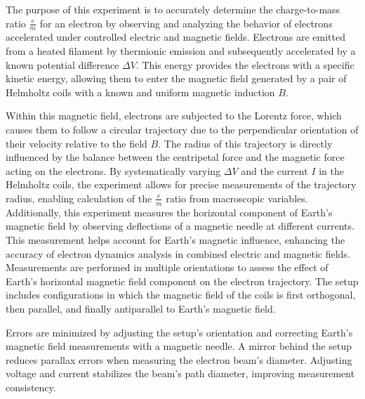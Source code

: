 
%


The purpose of this experiment is to accurately determine the charge-to-mass ratio \( \frac{e}{m} \) for an electron by observing and analyzing the behavior of electrons accelerated under controlled electric and magnetic fields. Electrons are emitted from a heated filament by thermionic emission and subsequently accelerated by a known potential difference \( \Delta V \). This energy provides the electrons with a specific kinetic energy, allowing them to enter the magnetic field generated by a pair of Helmholtz coils with a known and uniform magnetic induction \( B \). 

Within this magnetic field, electrons are subjected to the Lorentz force, which causes them to follow a circular trajectory due to the perpendicular orientation of their velocity relative to the field \( B \). The radius of this trajectory is directly influenced by the balance between the centripetal force and the magnetic force acting on the electrons. By systematically varying \( \Delta V \) and the current \( I \) in the Helmholtz coils, the experiment allows for precise measurements of the trajectory radius, enabling calculation of the \( \frac{e}{m} \) ratio from macroscopic variables.
Additionally, this experiment measures the horizontal component of Earth’s magnetic field by observing deflections of a magnetic needle at different currents. This measurement helps account for Earth’s magnetic influence, enhancing the accuracy of electron dynamics analysis in combined electric and magnetic fields. Measurements are performed in multiple orientations to assess the effect of Earth’s horizontal magnetic field component on the electron trajectory. The setup includes configurations in which the magnetic field of the coils is first orthogonal, then parallel, and finally antiparallel to Earth’s magnetic field.

Errors are minimized by adjusting the setup's orientation and correcting Earth’s magnetic field measurements with a magnetic needle. A mirror behind the setup reduces parallax errors when measuring the electron beam's diameter. Adjusting voltage and current stabilizes the beam's path diameter, improving measurement consistency.

